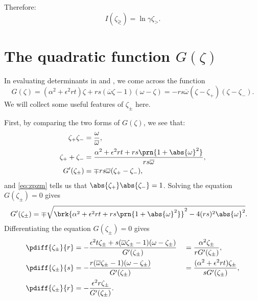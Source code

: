 \documentclass[12pt]{article}
\newcommand{\omb}{\overline{\omega}}
\newcommand{\opo}{\prn{1+\abs{\omega}^2}}
\begin{document}
Therefore:
%
\begin{equation}\label{eq:countourintresult}
  I(\zeta_\gtrless) = \ln\gamma\zeta_>.
\end{equation}
%


\section{The quadratic function \texorpdfstring{$G(\zeta)$}{G(zeta)}}\label{sec:Gamma}

In evaluating determinants in  and , we come across the function
%
\begin{equation}\label{eq:Gammadef}
  G(\zeta) = (\alpha^2+\epsilon^2rt)\zeta + rs(\omb\zeta-1)(\omega-\zeta) = - rs\omb (\zeta-\zeta_+) (\zeta-\zeta_-).
\end{equation}
%
We will collect some useful features of $\zeta_\pm$ here.

First, by comparing the two forms of $G(\zeta)$, we see that:
%
\begin{align}
\label{eq:zpzm}
  \zeta_+ \zeta_- &= \frac{\omega}{\omb},\\
  \label{eq:zppzm}
  \zeta_+ + \zeta_- &= \frac{\alpha^2+\epsilon^2rt + rs\opo}{rs\omb},\\
  \label{eq:Gprime}
  G'(\zeta_\pm) &= \mp rs\omb(\zeta_+ - \zeta_-),
\end{align}
%
and \eqref{eq:zpzm} tells us that $\abs{\zeta_+} \abs{\zeta_-}=1$.
Solving the equation $G(\zeta_\pm)=0$ gives
%
\begin{align}
\label{eq:Gprimesol}
  G'(\zeta_\pm) &= \mp\sqrt{\brk{\alpha^2+\epsilon^2rt + rs\opo}^2
       - 4(rs)^2\abs{\omega}^2}.
\end{align}
%
Differentiating the equation $G(\zeta_\pm)=0$ gives
%
\begin{equation}\label{eq:dzpmdrst}
\begin{aligned}
  \pdiff{\zeta_\pm}{r} &=
    -\frac{\epsilon^2t\zeta_\pm + s(\omb\zeta_\pm-1)(\omega-\zeta_\pm)}{G'(\zeta_\pm)}
    &&= \frac{\alpha^2\zeta_\pm}{rG'(\zeta_\pm)},\\
  \pdiff{\zeta_\pm}{s} &=
    -\frac{r(\omb\zeta_\pm-1)(\omega-\zeta_\pm)}{G'(\zeta_\pm)}
    &&= \frac{(\alpha^2+\epsilon^2rt)\zeta_\pm}{sG'(\zeta_\pm)},\\
  \pdiff{\zeta_\pm}{r} &=
    -\frac{\epsilon^2r\zeta_\pm}{G'(\zeta_\pm)}.
\end{aligned}
\end{equation}
%








\end{document}
